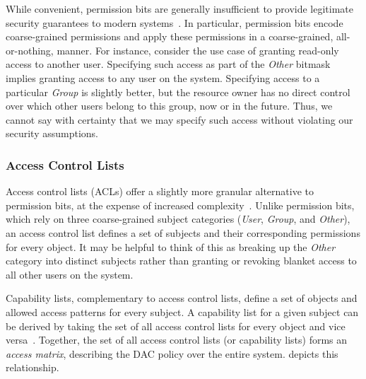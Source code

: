 While convenient, permission bits are generally insufficient to provide legitimate
security guarantees to modern systems~\cite{van_oorschot2020_tools_jewels,
jaeger2008_os_security}. In particular, permission bits encode coarse-grained permissions
and apply these permissions in a coarse-grained, all-or-nothing, manner. For instance,
consider the use case of granting read-only access to another user. Specifying such access
as part of the \textit{Other} bitmask implies granting access to any user on the system.
Specifying access to a particular \textit{Group} is slightly better, but the resource
owner has no direct control over which other users belong to this group, now or in the
future. Thus, we cannot say with certainty that we may specify such access without
violating our security assumptions.

\subsubsection*{Access Control Lists}

Access control lists (ACLs) offer a slightly more granular alternative to permission bits,
at the expense of increased complexity~\cite{jaeger2008_os_security,
van_oorschot2020_tools_jewels}. Unlike permission bits, which rely on three coarse-grained
subject categories (\textit{User}, \textit{Group}, and \textit{Other}), an access control
list defines a set of subjects and their corresponding permissions for every object. It
may be helpful to think of this as breaking up the \textit{Other} category into distinct
subjects rather than granting or revoking blanket access to all other users on the system.

Capability lists, complementary to access control lists, define a set of objects and
allowed access patterns for every subject. A capability list for a given subject can be
derived by taking the set of all access control lists for every object and vice
versa~\cite{van_oorschot2020_tools_jewels}. Together, the set of all access control lists
(or capability lists) forms an \textit{access matrix}, describing the DAC policy over
the entire system.  depicts this relationship.

